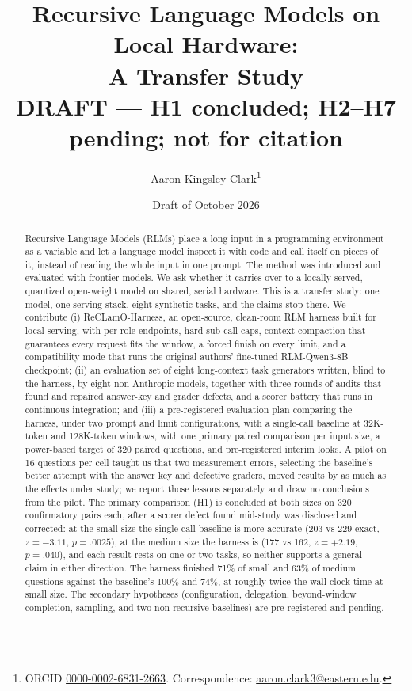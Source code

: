 \documentclass[11pt]{article}
\title{\textbf{Recursive Language Models on Local Hardware:\\A Transfer Study}\\[0.5ex]
\large\textcolor{red!70!black}{DRAFT --- H1 concluded; H2--H7 pending; not for citation}}
\author{Aaron Kingsley Clark\thanks{ORCID \href{https://orcid.org/0000-0002-6831-2663}{0000-0002-6831-2663}. Correspondence: \href{mailto:aaron.clark3@eastern.edu}{aaron.clark3@eastern.edu}.}}
\affil{Applied Artificial Intelligence\\Eastern University, St.~Davids, PA, USA}
\date{Draft of October 2026}
\begin{document}
\maketitle

\begin{abstract}
Recursive Language Models (RLMs) place a long input in a programming environment
as a variable and let a language model inspect it with code and call itself on
pieces of it, instead of reading the whole input in one prompt. The method was
introduced and evaluated with frontier models. We ask whether it carries over to a
locally served, quantized open-weight model on shared, serial hardware. This is a
transfer study: one model, one serving stack, eight synthetic tasks, and the claims
stop there. We contribute (i) ReCLamO-Harness, an open-source, clean-room RLM harness built for
local serving, with per-role endpoints, hard sub-call caps, context compaction that
guarantees every request fits the window, a forced finish on every limit, and a
compatibility mode that runs the original authors' fine-tuned RLM-Qwen3-8B
checkpoint; (ii) an evaluation set of eight long-context task generators written,
blind to the harness, by eight non-Anthropic models, together with three rounds of
audits that found and repaired answer-key and grader defects, and a scorer battery
that runs in continuous integration; and (iii) a pre-registered evaluation plan
comparing the harness, under two prompt and limit configurations, with a single-call baseline at 32K-token and 128K-token windows, with one primary
paired comparison per input size, a power-based target of 320 paired questions, and
pre-registered interim looks. A pilot on 16 questions per cell taught us that two
measurement errors, selecting the baseline's better attempt with the answer key and
defective graders, moved results by as much as the effects under study; we report
those lessons separately and draw no conclusions from the pilot.
The primary comparison (H1) is concluded at both sizes on 320 confirmatory pairs
each, after a scorer defect found mid-study was disclosed and corrected: at the small
size the single-call baseline is more accurate (203 vs 229 exact, $z=-3.11$,
$p=.0025$), at the medium size the harness is (177 vs 162, $z=+2.19$, $p=.040$), and
each result rests on one or two tasks, so neither supports a general claim in either
direction. The harness finished 71\% of small and 63\% of medium questions against the
baseline's 100\% and 74\%, at roughly twice the wall-clock time at small size. The
secondary hypotheses (configuration, delegation, beyond-window completion, sampling,
and two non-recursive baselines) are pre-registered and pending.
\end{abstract}
\end{document}
